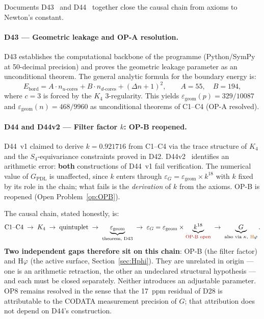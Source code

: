 \documentclass[11pt,a4paper]{article}
\theoremstyle{plain}
\theoremstyle{definition}
\theoremstyle{remark}
\begin{document}
Documents D43~\cite{D43} and D44~\cite{D44} together close the causal chain from axioms to Newton's constant.

\paragraph{D43 --- Geometric leakage and OP-A resolution.} D43 establishes the computational backbone of the programme (Python/SymPy at 50-decimal precision) and proves the geometric leakage parameter as an unconditional theorem. The general analytic formula for the boundary energy is:
\begin{equation}
E_{\mathrm{bord}} = A \cdot n_{u\text{-cores}} + B \cdot n_{d\text{-cores}} + (\Delta n+1)^2, \qquad A = 55,\quad B = 194,
\end{equation}
where $c=3$ is forced by the $K_4$ 3-regularity. This yields $\varepsilon_{\mathrm{geom}}(p) = 329/10087$ and $\varepsilon_{\mathrm{geom}}(n) = 468/9960$ as unconditional theorems of C1--C4 (OP-A resolved).

\paragraph{D44 and D44v2 --- Filter factor $k$: OP-B reopened.} D44~v1 claimed to derive $k = 0.921716$ from C1--C4 via the trace structure of $K_4$ and the $S_4$-equivariance constraints proved in D42. \textcolor{negativered}{D44v2~\cite{D44v2} identifies an arithmetic error: \textbf{both} constructions of D44~v1 fail verification.} The numerical value of $G_{\mathrm{PDL}}$ is unaffected, since $k$ enters through $\varepsilon_G=\varepsilon_{\mathrm{geom}}\times k^{18}$ with $k$ fixed by its role in the chain; what fails is the \emph{derivation} of $k$ from the axioms. \textcolor{openproblemred}{OP-B is reopened} (Open Problem~\ref{op:OPB}).

The causal chain, stated honestly, is:
\begin{equation*}
\text{C1--C4} \;\to\; K_4 \;\to\; \text{quintuplet} \;\to\; \underbrace{\varepsilon_{\mathrm{geom}}}_{\text{theorem, D43}} \;\to\; \varepsilon_G = \varepsilon_{\mathrm{geom}} \times \underbrace{k^{18}}_{\text{\textcolor{openproblemred}{OP-B open}}} \;\to\; \underbrace{G}_{\text{also via }\kappa,\ \text{\textcolor{hypothesisorange}{H}}\varphi}.
\end{equation*}
\textbf{Two independent gaps therefore sit on this chain}: OP-B (the filter factor) and H$\varphi$ (the active surface, Section~\ref{sec:Hphi}). They are unrelated in origin --- one is an arithmetic retraction, the other an undeclared structural hypothesis --- and each must be closed separately. Neither introduces an adjustable parameter. OP8 remains resolved in the sense that the 17~ppm residual of D28 is attributable to the CODATA measurement precision of $G$; that attribution does not depend on D44's construction.
\end{document}
